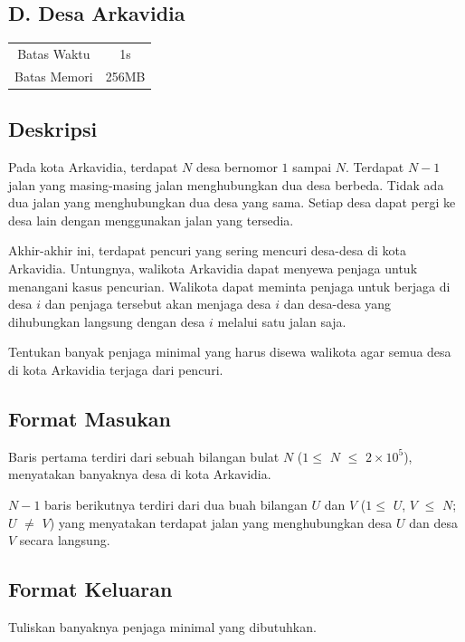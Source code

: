 \documentclass{article}
\begin{document}
\begin{center}
    \section*{D. Desa Arkavidia} %

    \begin{tabular}{ | c c | }
        \hline
        Batas Waktu  & 1s \\    %
        Batas Memori & 256MB \\  %
        \hline
    \end{tabular}
\end{center}

\subsection*{Deskripsi}
Pada kota Arkavidia, terdapat $N$ desa bernomor $1$ sampai $N$. Terdapat $N-1$ jalan yang masing-masing jalan menghubungkan dua desa berbeda. Tidak ada dua jalan yang menghubungkan dua desa yang sama. Setiap desa dapat pergi ke desa lain dengan menggunakan jalan yang tersedia.

Akhir-akhir ini, terdapat pencuri yang sering mencuri desa-desa di kota Arkavidia. Untungnya, walikota Arkavidia dapat menyewa penjaga untuk menangani kasus pencurian. Walikota dapat meminta penjaga untuk berjaga di desa $i$ dan penjaga tersebut akan menjaga desa $i$ dan desa-desa yang dihubungkan langsung dengan desa $i$ melalui satu jalan saja.

Tentukan banyak penjaga minimal yang harus disewa walikota agar semua desa di kota Arkavidia terjaga dari pencuri.

\subsection*{Format Masukan}
Baris pertama terdiri dari sebuah bilangan bulat $N$  ($1 \leq$ $N$ $\leq$ $2 \times 10^5$), menyatakan banyaknya desa di kota Arkavidia.

$N-1$ baris berikutnya terdiri dari dua buah bilangan $U$ dan $V$ ($1 \leq$ $U$, $V$ $ \leq$ $N$; $U$ $\neq$ $V$) yang menyatakan terdapat jalan yang menghubungkan desa $U$ dan desa $V$ secara langsung.

\subsection*{Format Keluaran}
Tuliskan banyaknya penjaga minimal yang dibutuhkan.
\end{document}

